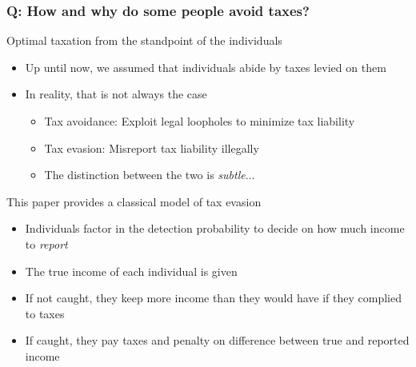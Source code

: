 \documentclass[aspectratio=169]{beamer}
\begin{document}
\begin{frame}
\frametitle{Q: How and why do some people avoid taxes?}
Optimal taxation from the standpoint of the individuals
\begin{itemize}\setlength\itemsep{3pt}
\item Up until now, we assumed that individuals abide by taxes levied on them
\item In reality, that is not always the case
 \begin{itemize}\setlength\itemsep{3pt}
\item Tax avoidance: Exploit legal loopholes to minimize tax liability
\item Tax evasion: Misreport tax liability illegally
\item The distinction between the two is \textit{subtle}...
\end{itemize}
\end{itemize}\medskip
This paper provides a classical model of tax evasion
\begin{itemize}\setlength\itemsep{3pt}
\item Individuals factor in the detection probability to decide on how much income to \textit{report}
\item The true income of each individual is given
\item If not caught, they keep more income than they would have if they complied to taxes
\item If caught, they pay taxes and penalty on difference between true and reported income
\end{itemize}
\end{frame}
\end{document}
